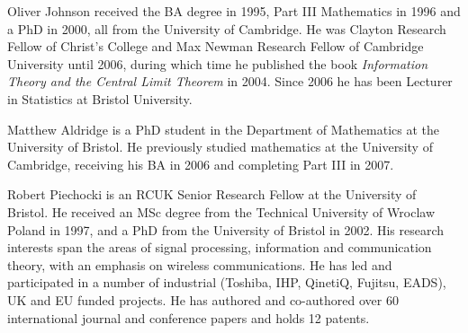 \documentclass[journal]{IEEEtran}
\begin{document}
\begin{IEEEbiographynophoto}
{Oliver Johnson} received the BA degree in 1995, Part III Mathematics
in 1996 and a PhD in 2000, all from the University of Cambridge.
He was Clayton Research Fellow of Christ's College
and Max Newman Research Fellow of Cambridge University until 2006,
during which time he published the book {\em Information Theory and
the Central Limit Theorem} in 2004. Since 2006 he has been Lecturer
in Statistics at Bristol University.
\end{IEEEbiographynophoto}

\begin{IEEEbiographynophoto}
{Matthew Aldridge} is a PhD student in the Department of
     Mathematics at the University of Bristol. He previously studied 
mathematics at the University of
     Cambridge, receiving his BA in 2006 and completing Part III
     in 2007.
\end{IEEEbiographynophoto}

\begin{IEEEbiographynophoto}
{Robert Piechocki} is an RCUK Senior Research Fellow at the University of 
Bristol. He received an MSc degree from the Technical University of Wroclaw 
Poland in 1997, and a PhD from the University of Bristol in 2002. His research 
interests span the areas of signal processing, information and communication 
theory, with an emphasis on wireless communications. He has led and 
participated in a number of industrial (Toshiba, IHP, QinetiQ, Fujitsu, EADS), 
UK and EU funded projects. He has authored and co-authored over 
60 international journal and conference papers and holds 12 patents.
\end{IEEEbiographynophoto}
\end{document}
